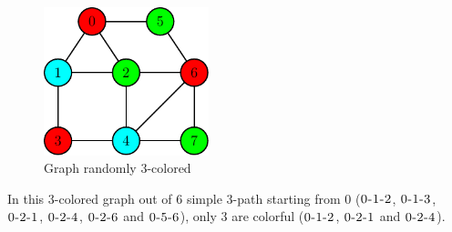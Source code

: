 \begin{esempio}
	
	\begin{figure}[h]
		\centering
		\begin{minipage}[t]{1\textwidth}
		\centering
		\includegraphics[width=4.8cm,height=4.3cm]{figure/figure-2-6}
		\caption{Graph randomly $3$-colored}
		\end{minipage}\hfill
	\end{figure}

	In this $3$-colored graph out of $6$ simple $3$-path starting from $0$ 
	($\textsc{0-1-2}$, $\textsc{0-1-3}$, $\textsc{0-2-1}$, $\textsc{0-2-4}$, $\textsc{0-2-6}$ and $\textsc{0-5-6}$), 
	only $3$ are colorful ($\textsc{0-1-2}$, $\textsc{0-2-1}$ and $\textsc{0-2-4}$).
\end{esempio}

\clearpage
